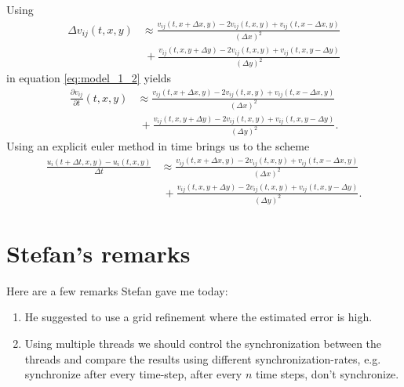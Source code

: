 \documentclass[12pt,a4paper]{article}
\begin{document}
Using
\begin{align*}
\Delta v_{ij} (t,x,y) & \approx \frac{v_{ij}(t,x+\Delta x,y) - 2 v_{ij}(t,x,y) + v_{ij}(t,x - \Delta x,y)}{(\Delta x)^{2}} \\
&\ + \frac{v_{ij}(t,x,y +\Delta y) - 2 v_{ij}(t,x,y) + v_{ij}(t,x,y - \Delta y)}{(\Delta y)^{2}}
\end{align*}
in equation \eqref{eq:model_1_2} yields
\begin{align*}
\frac{\partial v_{ij}}{\partial t} (t,x,y) & \approx \frac{v_{ij}(t,x+\Delta x,y) - 2 v_{ij}(t,x,y) + v_{ij}(t,x - \Delta x,y)}{(\Delta x)^{2}} \\
&\ + \frac{v_{ij}(t,x,y +\Delta y) - 2 v_{ij}(t,x,y) + v_{ij}(t,x,y - \Delta y)}{(\Delta y)^{2}}.
\end{align*}
Using an explicit euler method in time brings us to the scheme
\begin{align*}
\frac{u_{i}(t+ \Delta t,x,y)-u_{i}(t,x,y)}{\Delta t} & \approx \frac{v_{ij}(t,x+\Delta x,y) - 2 v_{ij}(t,x,y) + v_{ij}(t,x - \Delta x,y)}{(\Delta x)^{2}} \\
&\ + \frac{v_{ij}(t,x,y +\Delta y) - 2 v_{ij}(t,x,y) + v_{ij}(t,x,y - \Delta y)}{(\Delta y)^{2}}.
\end{align*}

\section{Stefan's remarks}
Here are a few remarks Stefan gave me today:
\begin{enumerate}
\item He suggested to use a grid refinement where the estimated error is high.
\item Using multiple threads we should control the synchronization between the threads and compare the results using different synchronization-rates, e.g. synchronize after every time-step, after every $n$ time steps, don't synchronize.
\end{enumerate}
\end{document}

